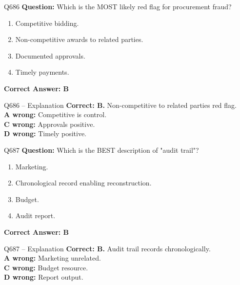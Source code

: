 \documentclass[aspectratio=169,10pt]{beamer}
\begin{document}
	\begin{frame}[t]{Q686}
		\small
		\textbf{Question:} Which is the MOST likely red flag for procurement fraud?
		\begin{enumerate}[label=\Alph*.,itemsep=1pt,topsep=2pt]
			\item Competitive bidding.
			\item Non-competitive awards to related parties.
			\item Documented approvals.
			\item Timely payments.
		\end{enumerate}
		\vspace{4pt}
		\textbf{Correct Answer: B}
	\end{frame}
	
	\begin{frame}[t]{Q686 -- Explanation}
		\small
		\textbf{Correct: B.} Non-competitive to related parties red flag. \\[4pt]
		\textbf{A wrong:} Competitive is control. \\[2pt]
		\textbf{C wrong:} Approvals positive. \\[2pt]
		\textbf{D wrong:} Timely positive.
	\end{frame}
	
	\begin{frame}[t]{Q687}
		\small
		\textbf{Question:} Which is the BEST description of "audit trail"?
		\begin{enumerate}[label=\Alph*.,itemsep=1pt,topsep=2pt]
			\item Marketing.
			\item Chronological record enabling reconstruction.
			\item Budget.
			\item Audit report.
		\end{enumerate}
		\vspace{4pt}
		\textbf{Correct Answer: B}
	\end{frame}
	
	\begin{frame}[t]{Q687 -- Explanation}
		\small
		\textbf{Correct: B.} Audit trail records chronologically. \\[4pt]
		\textbf{A wrong:} Marketing unrelated. \\[2pt]
		\textbf{C wrong:} Budget resource. \\[2pt]
		\textbf{D wrong:} Report output.
	\end{frame}
	
\end{document}
